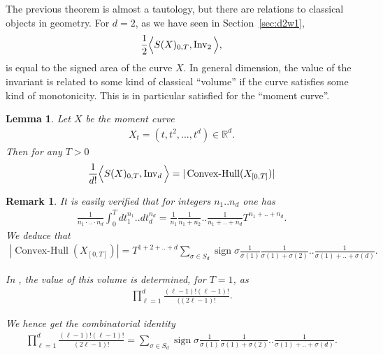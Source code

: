 \documentclass{scrartcl}
\theoremstyle{plain}
\newtheorem{lemma}[theorem]{Lemma}
\newtheorem{remark}[theorem]{Remark}
\theoremstyle{definition}
\newcommand{\R}{\mathbb{R}}
\newcommand{\1}[1]{1_{\{#1\}}}
\newcommand{\ds}{d} %
\newcommand{\sign}{\operatorname{sign}}
\begin{document}
The previous theorem is almost a tautology, but there are relations to classical objects in geometry.
For $\ds=2$, as we have seen in Section~\ref{sec:d2w1},
\begin{align*}
  \frac{1}{2} \Big\langle S(X)_{0,T}, \operatorname{Inv}_{2} \Big\rangle,
\end{align*}
is equal to the signed area of the curve $X$.
In general dimension, the value of the invariant is related
to some kind of classical ``volume'' if the curve satisfies
some kind of monotonicity.
This is in particular satisfied for the ``moment curve''.
\begin{lemma}
  \label{lem:momentCurve}
  Let $X$ be the moment curve
  \begin{align*}
    X_t = (t,t^2,...,t^\ds) \in \R^\ds.
  \end{align*}
  Then for any $T > 0$
  \begin{align*}
    \frac{1}{\ds !} \Big\langle S(X)_{0,T}, \firstInvariant{\ds} \Big\rangle
    =
    |\operatorname{Convex-Hull}( X_{[0,T]} )|
  \end{align*}
\end{lemma}
\begin{remark}
  It is easily verified that for integers $n_1 .. n_\ds$ one has
  \begin{align*}
    \frac{1}{n_1 \cdot .. \cdot n_\ds}
    \int_0^T dt_1^{n_1} .. dt_\ds^{n_\ds}
    =
    \frac{1}{n_1}
    \frac{1}{n_1+n_2}
    ..
    \frac{1}{n_1+..+n_\ds}
    T^{n_1+..+n_\ds}.
  \end{align*}
  We deduce that
  \begin{align*}
    |\operatorname{Convex-Hull}( X_{[0,T]} )|
    =
    T^{1+2+..+\ds}
    \sum_{\sigma\in S_\ds} \sign \sigma
    \frac{1}{\sigma(1)}
    \frac{1}{\sigma(1)+\sigma(2)}
    ..
    \frac{1}{\sigma(1)+..+\sigma(\ds)}.
  \end{align*}

  In \cite[Section 15]{bib:KS1953}, 
  the value of this volume is determined,
  for $T=1$, as
  \begin{align*}
    \prod_{\ell=1}^\ds \frac{(\ell-1)! (\ell-1)!}{((2\ell-1)!}.
  \end{align*}

  We hence get the combinatorial identity
  \begin{align*}
    \prod_{\ell=1}^\ds \frac{(\ell-1)! (\ell-1)!}{(2\ell-1)!}
    =
    \sum_{\sigma\in S_\ds}
    \sign \sigma
    \frac{1}{\sigma(1)}
    \frac{1}{\sigma(1)+\sigma(2)}
    ..
    \frac{1}{\sigma(1)+..+\sigma(\ds)}.
  \end{align*}
\end{remark}
\end{document}
